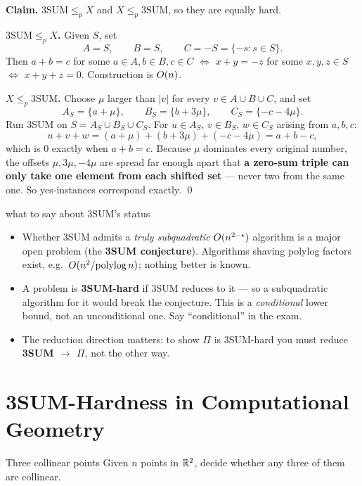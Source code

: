 \begin{correct}
\textbf{Claim.} $\mathrm{3SUM}\le_p X$ and $X\le_p \mathrm{3SUM}$, so they are equally hard.

\smallskip\noindent\textbf{$\mathrm{3SUM}\le_p X$.} Given $S$, set
\[
  A=S,\qquad B=S,\qquad C=-S=\{-s:s\in S\}.
\]
Then $a+b=c$ for some $a\in A,b\in B,c\in C$ $\iff$ $x+y=-z$ for some $x,y,z\in S$ $\iff$
$x+y+z=0$. Construction is $O(n)$.

\smallskip\noindent\textbf{$X\le_p \mathrm{3SUM}$.} Choose $\mu$ larger than $|v|$ for every
$v\in A\cup B\cup C$, and set
\[
  A_S=\{a+\mu\},\qquad B_S=\{b+3\mu\},\qquad C_S=\{-c-4\mu\} .
\]
Run 3SUM on $S=A_S\cup B_S\cup C_S$. For $u\in A_S$, $v\in B_S$, $w\in C_S$ arising from $a,b,c$:
\[
  u+v+w=(a+\mu)+(b+3\mu)+(-c-4\mu)=a+b-c,
\]
which is $0$ exactly when $a+b=c$. Because $\mu$ dominates every original number, the offsets
$\mu,3\mu,-4\mu$ are spread far enough apart that \textbf{a zero-sum triple can only take one
element from each shifted set} --- never two from the same one. So yes-instances correspond
exactly. \qed
\end{correct}

\begin{facts}{what to say about 3SUM's status}
\begin{itemize}
  \item Whether 3SUM admits a \emph{truly subquadratic} $O(n^{2-\epsilon})$ algorithm is a
        major open problem (the \textbf{3SUM conjecture}). Algorithms shaving polylog factors
        exist, e.g.\ $O(n^2/\mathrm{polylog}\,n)$; nothing better is known.
  \item A problem is \textbf{3SUM-hard} if 3SUM reduces to it --- so a subquadratic algorithm for
        it would break the conjecture. This is a \emph{conditional} lower bound, not an
        unconditional one. Say ``conditional'' in the exam.
  \item The reduction direction matters: to show $\Pi$ is 3SUM-hard you must reduce
        \textbf{3SUM $\to$ $\Pi$}, not the other way.
\end{itemize}
\end{facts}

\section{3SUM-Hardness in Computational Geometry}

\begin{prob}{Three collinear points}
Given $n$ points in $\mathbb{R}^2$, decide whether any three of them are collinear.
\end{prob}

